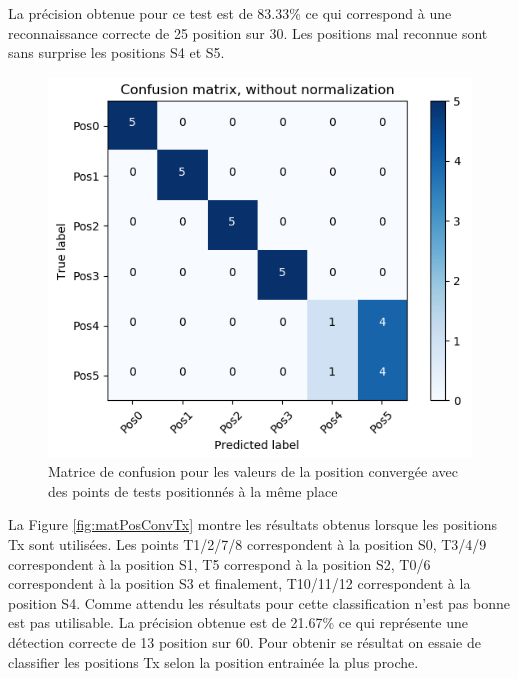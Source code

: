 La précision obtenue pour ce test est de 83.33\% ce qui correspond à une reconnaissance correcte de 25 position sur 30. Les positions mal reconnue sont sans surprise les positions S4 et S5.

\begin{figure}[htp]
	\begin{center}
		\includegraphics[scale=0.5]{figures/mat_pos_conv_SxT.png}
		\caption{Matrice de confusion pour les valeurs de la position convergée avec des points de tests positionnés à la même place}
		\label{fig:matPosConvSxT} %
	\end{center}
\end{figure}

La Figure \ref{fig:matPosConvTx} montre les résultats obtenus lorsque les positions Tx sont utilisées. Les points T1/2/7/8 correspondent à la position S0, T3/4/9 correspondent à la position S1, T5 correspond à la position S2, T0/6 correspondent à la position S3 et finalement, T10/11/12 correspondent à la position S4. Comme attendu les résultats pour cette classification n'est pas bonne est pas utilisable. La précision obtenue est de 21.67\% ce qui représente une détection correcte de 13 position sur 60. Pour obtenir se résultat on essaie de classifier les positions Tx selon la position entrainée la plus proche. 

